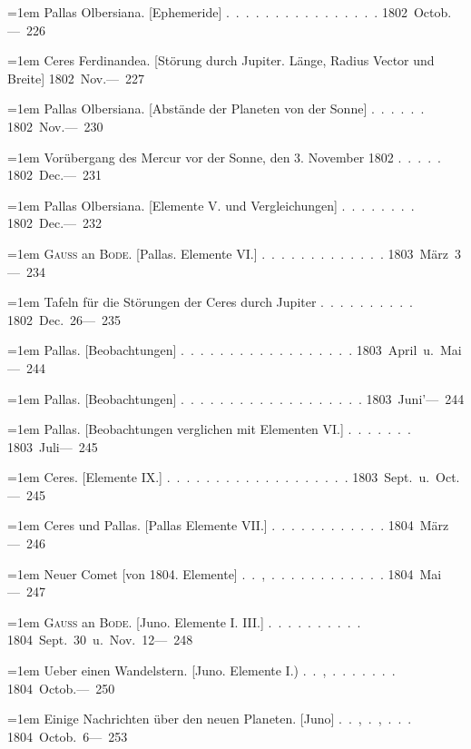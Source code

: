 \noindent\hangindent=1em Pallas Olbersiana. [Ephemeride] \mbox{.\ .\ .\ .\ .\ .\ .\ .\ .\ .\ .\ .\ .\ .\ .\ .} \hfill\mbox{1802 Octob.}\quad\mbox{--- 226}\par\smallskip
\noindent\hangindent=1em Ceres Ferdinandea. [Störung durch Jupiter. Länge, Radius Vector und Breite] \hfill\mbox{1802 Nov.}\quad\mbox{--- 227}\par\smallskip
\noindent\hangindent=1em Pallas Olbersiana. [Abstände der Planeten von der Sonne] \mbox{.\ .\ .\ .\ .\ .} \hfill\mbox{1802 Nov.}\quad\mbox{--- 230}\par\smallskip
\noindent\hangindent=1em Vorübergang des Mercur vor der Sonne, den 3. November 1802 \mbox{.\ .\ .\ .\ .} \hfill\mbox{1802 Dec.}\quad\mbox{--- 231}\par\smallskip
\noindent\hangindent=1em Pallas Olbersiana. [Elemente V. und Vergleichungen] \mbox{.\ .\ .\ .\ .\ .\ .\ .} \hfill\mbox{1802 Dec.}\quad\mbox{--- 232}\par\smallskip
\noindent\hangindent=1em \textsc{Gauss} an \textsc{Bode}. [Pallas. Elemente VI.] \mbox{.\ .\ .\ .\ .\ .\ .\ .\ .\ .\ .\ .\ .} \hfill\mbox{1803 März 3}\quad\mbox{--- 234}\par\smallskip
\noindent\hangindent=1em Tafeln für die Störungen der Ceres durch Jupiter \mbox{.\ .\ .\ .\ .\ .\ .\ .\ .\ .} \hfill\mbox{1802 Dec. 26}\quad\mbox{--- 235}\par\smallskip
\noindent\hangindent=1em Pallas. [Beobachtungen] \mbox{.\ .\ .\ .\ .\ .\ .\ .\ .\ .\ .\ .\ .\ .\ .\ .\ .\ .} \hfill\mbox{1803 April u. Mai}\quad\mbox{--- 244}\par\smallskip
\noindent\hangindent=1em Pallas. [Beobachtungen] \mbox{.\ .\ .\ .\ .\ .\ .\ .\ .\ .\ .\ .\ .\ .\ .\ .\ .\ .\ .} \hfill\mbox{1803 Juni}\quad\mbox{'--- 244}\par\smallskip
\noindent\hangindent=1em Pallas. [Beobachtungen verglichen mit Elementen VI.] \mbox{.\ .\ .\ .\ .\ .\ .} \hfill\mbox{1803 Juli}\quad\mbox{--- 245}\par\smallskip
\noindent\hangindent=1em Ceres. [Elemente IX.] \mbox{.\ .\ .\ .\ .\ .\ .\ .\ .\ .\ .\ .\ .\ .\ .\ .\ .\ .\ .} \hfill\mbox{1803 Sept. u. Oct.}\quad\mbox{--- 245}\par\smallskip
\noindent\hangindent=1em Ceres und Pallas. [Pallas Elemente VII.] \mbox{.\ .\ .\ .\ .\ .\ .\ .\ .\ .\ .\ .} \hfill\mbox{1804 März}\quad\mbox{--- 246}\par\smallskip
\noindent\hangindent=1em Neuer Comet [von 1804. Elemente] \mbox{.\ .\ ,\ .\ .\ .\ .\ .\ .\ .\ .\ .\ .\ .\ .} \hfill\mbox{1804 Mai}\quad\mbox{--- 247}\par\smallskip
\noindent\hangindent=1em \textsc{Gauss} an \textsc{Bode}. [Juno. Elemente I. III.] \mbox{.\ .\ .\ .\ .\ .\ .\ .\ .\ .} \hfill\mbox{1804 Sept. 30 u. Nov. 12}\quad\mbox{--- 248}\par\smallskip
\noindent\hangindent=1em Ueber einen Wandelstern. [Juno. Elemente I.) \mbox{.\ .\ ,\ .\ .\ .\ .\ .\ .\ .} \hfill\mbox{1804 Octob.}\quad\mbox{--- 250}\par\smallskip
\noindent\hangindent=1em Einige Nachrichten über den neuen Planeten. [Juno] \mbox{.\ .\ ,\ .\ ,\ .\ .\ .} \hfill\mbox{1804 Octob. 6}\quad\mbox{--- 253}\par\smallskip
\endgroup
